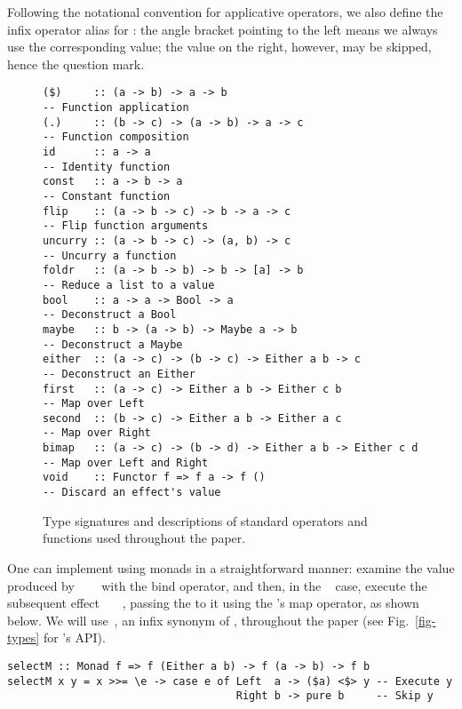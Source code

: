 Following the notational convention for applicative operators, we also define
the infix operator alias  for : the angle bracket pointing to
the left means we always use the corresponding value; the value on the right,
however, may be skipped, hence the question mark.

\begin{figure}
\begin{verbatim}
($)     :: (a -> b) -> a -> b                               -- Function application
(.)     :: (b -> c) -> (a -> b) -> a -> c                   -- Function composition
id      :: a -> a                                           -- Identity function
const   :: a -> b -> a                                      -- Constant function
flip    :: (a -> b -> c) -> b -> a -> c                     -- Flip function arguments
uncurry :: (a -> b -> c) -> (a, b) -> c                     -- Uncurry a function
foldr   :: (a -> b -> b) -> b -> [a] -> b                   -- Reduce a list to a value
bool    :: a -> a -> Bool -> a                              -- Deconstruct a Bool
maybe   :: b -> (a -> b) -> Maybe a -> b                    -- Deconstruct a Maybe
either  :: (a -> c) -> (b -> c) -> Either a b -> c          -- Deconstruct an Either
first   :: (a -> c) -> Either a b -> Either c b             -- Map over Left
second  :: (b -> c) -> Either a b -> Either a c             -- Map over Right
bimap   :: (a -> c) -> (b -> d) -> Either a b -> Either c d -- Map over Left and Right
void    :: Functor f => f a -> f ()                         -- Discard an effect's value
\end{verbatim}
\vspace{-2mm}
\caption{Type signatures and descriptions of standard operators and functions
used throughout the paper.}\label{fig-std}
\vspace{-3mm}
\end{figure}

One can implement  using monads in a straightforward manner: examine
the value produced by ~~~ with the bind operator,
and then, in the ~ case, execute the subsequent effect
~~\hs{->}~, passing the  to it using the
's map operator, as shown below. We will use~, an
infix synonym of , throughout the paper (see Fig.~\ref{fig-types} for
's API).

\vspace{0.5mm}
\begin{verbatim}
selectM :: Monad f => f (Either a b) -> f (a -> b) -> f b
selectM x y = x >>= \e -> case e of Left  a -> ($a) <$> y -- Execute y
                                    Right b -> pure b     -- Skip y
\end{verbatim}
\vspace{0.5mm}

